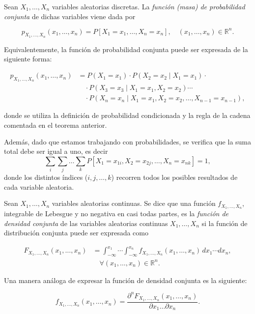 \begin{definicion}
    Sean $X_1, \ldots, X_n$ variables aleatorias discretas. La \emph{función (masa) de probabilidad conjunta} de dichas variables viene dada por

    \[ p_{X_1, \ldots, X_n}(x_1, \ldots, x_n) = P[X_1 = x_1, \ldots, X_n = x_n], \quad (x_1, \ldots, x_n) \in \mathbb{R}^n. \]

    Equivalentemente, la función de probabilidad conjunta puede ser expresada de la siguiente forma:

    \begin{align*}
        p_{X_1, \dots, X_n}(x_1, \dots, x_n) &= P(X_1 = x_1) \cdot P(X_2 = x_2 \mid X_1 = x_1) \cdot \\
        &\quad \cdot P(X_3 = x_3 \mid X_1 = x_1, X_2 = x_2) \cdots \\
        &\quad \cdot P(X_n = x_n \mid X_1 = x_1, X_2 = x_2, \dots, X_{n-1} = x_{n-1}),
    \end{align*}

    donde se utiliza la definición de probabilidad condicionada y la regla de la cadena comentada en el teorema anterior.
\end{definicion}

Además, dado que estamos trabajando con probabilidades, se verifica que la suma total debe ser igual a uno, es decir 
\[ \sum_{i}\sum_{j}\ldots\sum_{k}P[X_1=x_{1i}, X_2=x_{2j}, \ldots, X_n=x_{nk}] = 1, \] 
donde los distintos índices ($i, j, \ldots, k$) recorren todos los posibles resultados de cada variable aleatoria.

\begin{definicion}
    Sean $X_1, \ldots, X_n$ variables aleatorias continuas. Se dice que una función $f_{X_{1}, \ldots, X_n}$, integrable de Lebesgue y no negativa en casi todas partes, es la \emph{función de densidad conjunta} de las variables aleatorias continuas $X_1, \ldots, X_n$ si la función de distribución conjunta puede ser expresada como

    \begin{align*}
        F_{X_{1}, \ldots, X_{n}}(x_1, \ldots, x_n) &=  
        \int_{-\infty}^{x_1} \cdots \int_{-\infty}^{x_n} 
        f_{X_{1}, \ldots, X_n}(x_1, \ldots, x_n) \, dx_1 \cdots dx_n, \\
        &\quad \forall(x_1, \ldots, x_n) \in \mathbb{R}^n.
    \end{align*}

    Una manera análoga de expresar la función de densidad conjunta es la siguiente:

    \[ f_{X_{1}, \ldots, X_n} (x_1, \ldots, x_n) = \frac{\partial^{n}F_{X_{1}, \ldots, X_{n}}(x_1, \ldots, x_n)}{\partial x_1 \ldots \partial x_n}. \]
\end{definicion}

